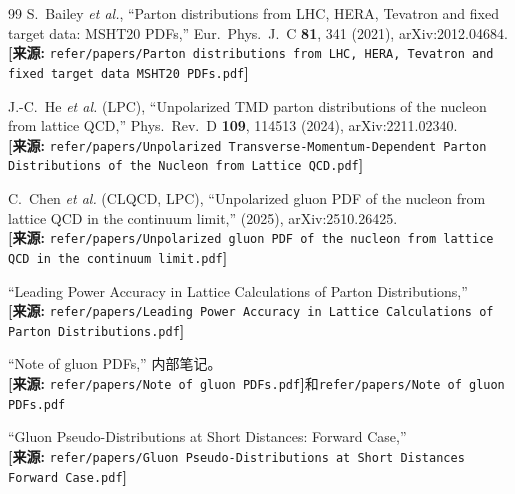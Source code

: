 \documentclass[12pt,a4paper]{ctexart}
\theoremstyle{definition}
\begin{document}
\begin{thebibliography}{99}
S.~Bailey \textit{et al.},
``Parton distributions from LHC, HERA, Tevatron and fixed target data: MSHT20 PDFs,''
Eur.\ Phys.\ J.\ C \textbf{81}, 341 (2021), arXiv:2012.04684.
\\\textbf{[来源:} \texttt{refer/papers/Parton distributions from LHC, HERA, Tevatron and fixed target data MSHT20 PDFs.pdf}\textbf{]}

J.-C.~He \textit{et al.} (LPC),
``Unpolarized TMD parton distributions of the nucleon from lattice QCD,''
Phys.\ Rev.\ D \textbf{109}, 114513 (2024), arXiv:2211.02340.
\\\textbf{[来源:} \texttt{refer/papers/Unpolarized Transverse-Momentum-Dependent Parton Distributions of the Nucleon from Lattice QCD.pdf}\textbf{]}

C.~Chen \textit{et al.} (CLQCD, LPC),
``Unpolarized gluon PDF of the nucleon from lattice QCD in the continuum limit,''
(2025), arXiv:2510.26425.
\\\textbf{[来源:} \texttt{refer/papers/Unpolarized gluon PDF of the nucleon from lattice QCD in the continuum limit.pdf}\textbf{]}

``Leading Power Accuracy in Lattice Calculations of Parton Distributions,''
\\\textbf{[来源:} \texttt{refer/papers/Leading Power Accuracy in Lattice Calculations of Parton Distributions.pdf}\textbf{]}

``Note of gluon PDFs,'' 内部笔记。
\\\textbf{[来源:} \texttt{refer/papers/Note of gluon PDFs.pdf}\textbf{]}和\texttt{refer/papers/Note of gluon PDFs.pdf}

``Gluon Pseudo-Distributions at Short Distances: Forward Case,''
\\\textbf{[来源:} \texttt{refer/papers/Gluon Pseudo-Distributions at Short Distances Forward Case.pdf}\textbf{]}

\end{thebibliography}
\end{document}
